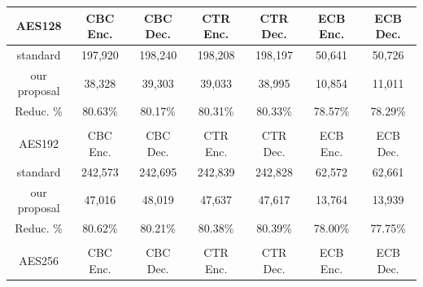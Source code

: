 \begin{table}[tp]
    \begin{tabular}{ccccccc}
    \rowcolor[HTML]{C0C0C0} 
    AES128                               & CBC Enc.             & CBC Dec.             & CTR Enc.             & CTR Dec.             & ECB Enc.             & ECB Dec.             \\ \hline
    \cellcolor[HTML]{EFEFEF}standard     & 197,920              & 198,240              & 198,208              & 198,197              & 50,641               & 50,726               \\
    \cellcolor[HTML]{EFEFEF}our proposal & 38,328               & 39,303               & 39,033               & 38,995               & 10,854               & 11,011               \\
    \cellcolor[HTML]{EFEFEF}Reduc. \%    & 80.63\%                & 80.17\%                & 80.31\%                & 80.33\%                & 78.57\%                & 78.29\%                \\
    \multicolumn{1}{l}{}                 & \multicolumn{1}{l}{} & \multicolumn{1}{l}{} & \multicolumn{1}{l}{} & \multicolumn{1}{l}{} & \multicolumn{1}{l}{} & \multicolumn{1}{l}{} \\
    \rowcolor[HTML]{C0C0C0}AES192       & CBC Enc.             & CBC Dec.             & CTR Enc.             & CTR Dec.             & ECB Enc.             & ECB Dec.             \\ \hline
    \cellcolor[HTML]{EFEFEF}standard     & 242,573              & 242,695              & 242,839              & 242,828              & 62,572               & 62,661               \\
    \cellcolor[HTML]{EFEFEF}our proposal & 47,016               & 48,019               & 47,637               & 47,617               & 13,764               & 13,939               \\
    \cellcolor[HTML]{EFEFEF}Reduc. \%    & 80.62\%                & 80.21\%                & 80.38\%                & 80.39\%                & 78.00\%                & 77.75\%                \\
    \multicolumn{1}{l}{}                 & \multicolumn{1}{l}{} & \multicolumn{1}{l}{} & \multicolumn{1}{l}{} & \multicolumn{1}{l}{} & \multicolumn{1}{l}{} & \multicolumn{1}{l}{} \\
    \rowcolor[HTML]{C0C0C0}AES256       & CBC Enc.             & CBC Dec.             & CTR Enc.             & CTR Dec.             & ECB Enc.             & ECB Dec.             \\ \hline

\end{tabular}
\end{table}
